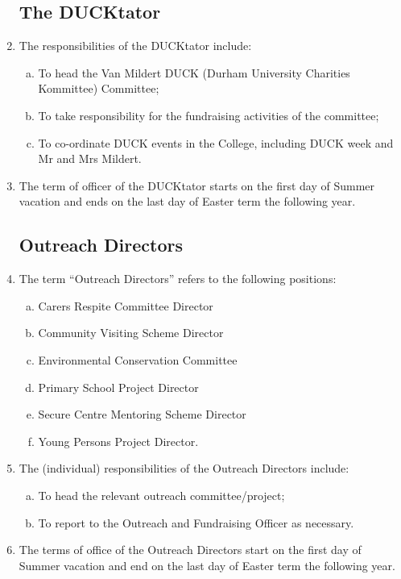 \documentclass[12pt]{article}
\begin{document}
\begin{enumerate}
    \subsection{The DUCKtator}
    \item The responsibilities of the DUCKtator include:
    \begin{enumerate}[(a)]
        \item To head the Van Mildert DUCK (Durham University Charities Kommittee) Committee;
        \item To take responsibility for the fundraising activities of the committee;
        \item To co-ordinate DUCK events in the College, including DUCK week and Mr and Mrs Mildert.
    \end{enumerate}
    \item The term of officer of the DUCKtator starts on the first day of Summer vacation and ends on the last day of Easter term the following year.
    \subsection{Outreach Directors}
    \item\label{def:outreach-directors} The term “Outreach Directors” refers to the following positions:
    \begin{enumerate}[(a)]
        \item Carers Respite Committee Director
        \item Community Visiting Scheme Director
        \item Environmental Conservation Committee
        \item Primary School Project Director
        \item Secure Centre Mentoring Scheme Director
        \item Young Persons Project Director.
    \end{enumerate}
    \item The (individual) responsibilities of the Outreach Directors include:
    \begin{enumerate}[(a)]
        \item To head the relevant outreach committee/project;
        \item To report to the Outreach and Fundraising Officer as necessary.
    \end{enumerate}
    \item The terms of office of the Outreach Directors start on the first day of Summer vacation and end on the last day of Easter term the following year.

\end{enumerate}
\end{document}

